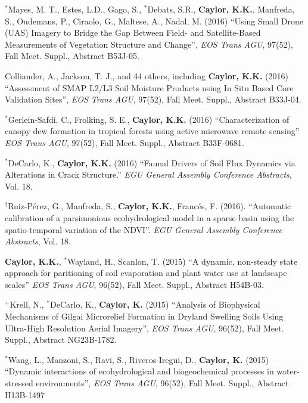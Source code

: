 \documentclass[10pt]{report}
\begin{document}
\begin{etaremune}
\item $^{*}$Mayes, M. T., Estes, L.D., Gago, S., $^{*}$Debats, S.R.,  \textbf{Caylor, K.K.}, Manfreda, S., Oudemans, P., Ciraolo, G., Maltese, A., Nadal, M. (2016) ``Using Small Drone (UAS) Imagery to Bridge the Gap Between Field- and Satellite-Based Measurements of Vegetation Structure and Change'', \emph{EOS Trans AGU}, 97(52), Fall Meet. Suppl., Abstract B53J-05.

\item Colliander, A., Jackson, T. J., and 44 others, including \textbf{Caylor, K.K.} (2016) ``Assessment of SMAP L2/L3 Soil Moisture Products using In Situ Based Core Validation Sites'',  \emph{EOS Trans AGU}, 97(52), Fall Meet. Suppl., Abstract B33J-04.

\item $^{*}$Gerlein-Safdi, C., Frolking, S. E., \textbf{Caylor, K.K.} (2016) ``Characterization of canopy dew formation in tropical forests using active microwave remote sensing'' \emph{EOS Trans AGU}, 97(52), Fall Meet. Suppl., Abstract B33F-0681.

\item  $^{*}$DeCarlo, K., \textbf{Caylor, K.K.} (2016) ``Faunal Drivers of Soil Flux Dynamics via Alterations in Crack Structure.'' \emph{EGU General Assembly Conference Abstracts}, Vol. 18.

\item $^{\dagger}$Ruiz-P\'erez, G., Manfreda, S.,  \textbf{Caylor, K.K.}, Franc\'es, F. (2016). ``Automatic calibration of a parsimonious ecohydrological model in a sparse basin using the spatio-temporal variation of the NDVI''. \emph{EGU General Assembly Conference Abstracts}, Vol. 18.

\item  \textbf{Caylor, K.K.}, $^{*}$Wayland, H., Scanlon, T. (2015) ``A dynamic, non-steady state approach for paritioning of soil evaporation and plant water use at landscape scales'' \emph{EOS Trans AGU}, 96(52), Fall Meet. Suppl., Abstract H54B-03.

\item $^{+}$Krell, N., $^{*}$DeCarlo, K., \textbf{Caylor, K.} (2015) ``Analysis of Biophysical Mechanisms of Gilgai Microrelief Formation in Dryland Swelling Soils Using Ultra-High Resolution Aerial Imagery'', \emph{EOS Trans AGU}, 96(52), Fall Meet. Suppl., Abstract NG23B-1782.

\item  $^{*}$Wang, L., Manzoni, S., Ravi, S., Riveros-Iregui, D., \textbf{Caylor, K.} (2015) ``Dynamic interactions of ecohydrological and biogeochemical processes in water-stressed environments'',  \emph{EOS Trans AGU}, 96(52), Fall Meet. Suppl., Abstract H13B-1497


\end{etaremune}
\end{document}

